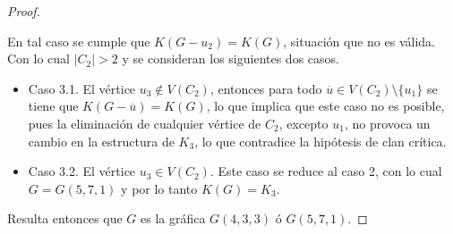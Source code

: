 \documentclass[12pt]{book}
\theoremstyle{definition}
\begin{document}
\begin{proof}
\begin{itemize}
En tal caso se cumple que $K(G-u_2)=K(G)$, situación que no es válida. Con lo cual $|C_2|>2$ y se consideran los siguientes dos casos.
\begin{itemize}
\item Caso 3.1.
El vértice $u_3\notin V(C_2)$, entonces para todo $\overline{u}\in V(C_2)\setminus\{u_1\}$ se tiene que $K(G-\overline{u})=K(G)$, lo que implica que este caso no es posible, pues la eliminación de cualquier vértice de $C_2$, excepto $u_1$, no provoca un cambio en la estructura de $K_3$, lo que contradice la hipótesis de clan crítica.

\item Caso 3.2.
El vértice $u_3\in V(C_2)$. Este caso se reduce al caso 2, con lo cual $G=G(5,7,1)$ y por lo tanto $K(G)=K_3$.
\end{itemize}
\end{itemize}
Resulta entonces que $G$ es la gráfica $G(4,3,3)$ ó $G(5,7,1)$.
\end{proof}




\end{document}

